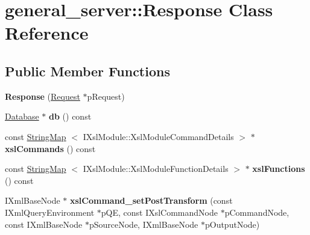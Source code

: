 \hypertarget{classgeneral__server_1_1Response}{\section{general\-\_\-server\-:\-:\-Response \-Class \-Reference}
\label{classgeneral__server_1_1Response}
}
\subsection*{\-Public \-Member \-Functions}
\begin{DoxyCompactItemize}
\item 
\hypertarget{classgeneral__server_1_1Response_aaddb6deaa9df5ecc9283d1d6394d8f76}{{\bfseries \-Response} (\hyperlink{classgeneral__server_1_1Request}{\-Request} $\ast$p\-Request)}\label{classgeneral__server_1_1Response_aaddb6deaa9df5ecc9283d1d6394d8f76}

\item 
\hypertarget{classgeneral__server_1_1Response_ab38cc744651c4cbeb0dae333cdbd6d22}{\hyperlink{classgeneral__server_1_1Database}{\-Database} $\ast$ {\bfseries db} () const }\label{classgeneral__server_1_1Response_ab38cc744651c4cbeb0dae333cdbd6d22}

\item 
\hypertarget{classgeneral__server_1_1Response_a52dc4274fb5004f3e84281909aeb68f3}{const \hyperlink{classgeneral__server_1_1StringMap}{\-String\-Map}\*
$<$ \-I\-Xsl\-Module\-::\-Xsl\-Module\-Command\-Details $>$ $\ast$ {\bfseries xsl\-Commands} () const }\label{classgeneral__server_1_1Response_a52dc4274fb5004f3e84281909aeb68f3}

\item 
\hypertarget{classgeneral__server_1_1Response_a278296601dcba8a9610147f7b0f1fc08}{const \hyperlink{classgeneral__server_1_1StringMap}{\-String\-Map}\*
$<$ \-I\-Xsl\-Module\-::\-Xsl\-Module\-Function\-Details $>$ $\ast$ {\bfseries xsl\-Functions} () const }\label{classgeneral__server_1_1Response_a278296601dcba8a9610147f7b0f1fc08}

\item 
\hypertarget{group__XSLModule-Commands_gaf57f947df9e59a4c76fc99add19b87ae}{\-I\-Xml\-Base\-Node $\ast$ {\bfseries xsl\-Command\-\_\-set\-Post\-Transform} (const \-I\-Xml\-Query\-Environment $\ast$p\-Q\-E, const \-I\-Xsl\-Command\-Node $\ast$p\-Command\-Node, const \-I\-Xml\-Base\-Node $\ast$p\-Source\-Node, \-I\-Xml\-Base\-Node $\ast$p\-Output\-Node)}\label{group__XSLModule-Commands_gaf57f947df9e59a4c76fc99add19b87ae}


\end{DoxyCompactItemize}

